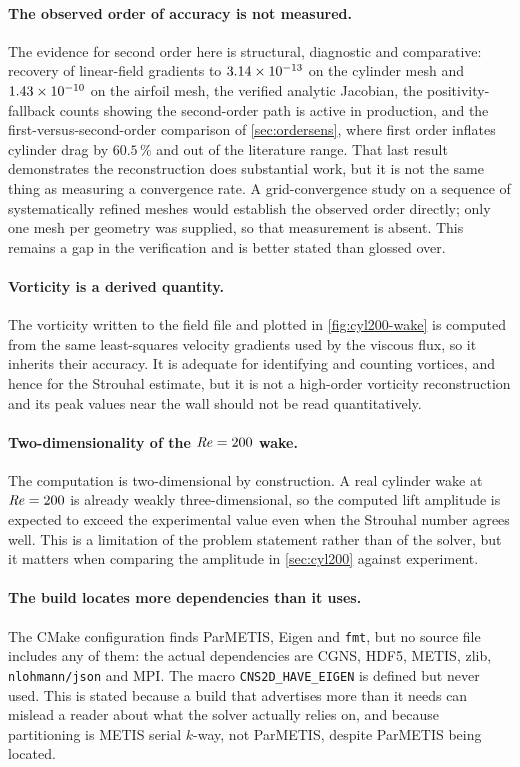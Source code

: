 \paragraph{The observed order of accuracy is not measured.} The evidence for
second order here is structural, diagnostic and comparative: recovery of
linear-field gradients to $\num{3.14e-13}$ on the cylinder mesh and
$\num{1.43e-10}$ on the airfoil mesh, the verified analytic Jacobian, the
positivity-fallback counts showing the second-order path is active in production,
and the first-versus-second-order comparison of \cref{sec:ordersens}, where first
order inflates cylinder drag by $60.5\,\%$ and out of the literature range. That
last result demonstrates the reconstruction does substantial work, but it is not
the same thing as measuring a convergence rate. A grid-convergence study on a
sequence of systematically refined meshes would establish the observed order
directly; only one mesh per geometry was supplied, so that measurement is absent.
This remains a gap in the verification and is better stated than glossed over.

\paragraph{Vorticity is a derived quantity.} The vorticity written to the field
file and plotted in \cref{fig:cyl200-wake} is computed from the same
least-squares velocity gradients used by the viscous flux, so it inherits their
accuracy. It is adequate for identifying and counting vortices, and hence for the
Strouhal estimate, but it is not a high-order vorticity reconstruction and its
peak values near the wall should not be read quantitatively.

\paragraph{Two-dimensionality of the $\mathit{Re}=200$ wake.} The computation is
two-dimensional by construction. A real cylinder wake at $\mathit{Re}=200$ is already
weakly three-dimensional, so the computed lift amplitude is expected to exceed the
experimental value even when the Strouhal number agrees well. This is a limitation
of the problem statement rather than of the solver, but it matters when comparing
the amplitude in \cref{sec:cyl200} against experiment.

\paragraph{The build locates more dependencies than it uses.} The CMake
configuration finds ParMETIS, Eigen and \texttt{fmt}, but no source file includes
any of them: the actual dependencies are CGNS, HDF5, METIS, zlib,
\texttt{nlohmann/json} and MPI. The macro \texttt{CNS2D\_HAVE\_EIGEN} is defined
but never used. This is stated because a build that advertises more than it needs
can mislead a reader about what the solver actually relies on, and because
partitioning is METIS serial $k$-way, not ParMETIS, despite ParMETIS being located.

